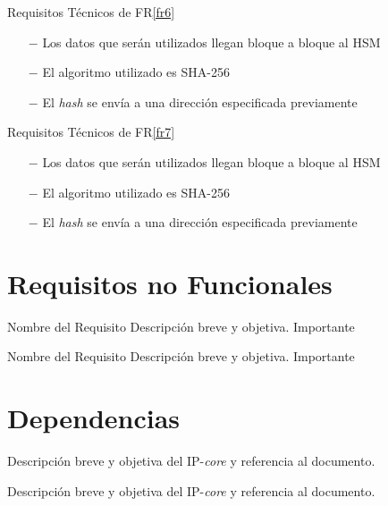 \documentclass{article}
\begin{document}
\begin{technical}
			\techrequirement
			{Requisitos Técnicos de FR\ref{fr6}}
      {
      \begin{itemize}
        \item[$-$]{Los datos que serán utilizados llegan bloque a bloque al HSM}
        \item[$-$]{El algoritmo utilizado es SHA-256}
				\item[$-$]{El \textit{hash} se envía a una dirección especificada previamente}
      \end{itemize}
      }
			
			\techrequirement
			{Requisitos Técnicos de FR\ref{fr7}}
      {
      \begin{itemize}
        \item[$-$]{Los datos que serán utilizados llegan bloque a bloque al HSM}
        \item[$-$]{El algoritmo utilizado es SHA-256}
				\item[$-$]{El \textit{hash} se envía a una dirección especificada previamente}
      \end{itemize}
      }
    \end{technical}    
 
\section{Requisitos no Funcionales}

  \begin{nonfunctional}
		{Nombre del Requisito}
    {Descripción breve y objetiva.}
    {Importante}

		{Nombre del Requisito}
    {Descripción breve y objetiva.}
    {Importante}
  \end{nonfunctional}

\section{Dependencias}

  \begin{dependencies}
		{Descripción breve y objetiva del IP-\textit{core} y referencia al documento.}

		{Descripción breve y objetiva del IP-\textit{core} y referencia al documento.}
  \end{dependencies}  
\end{document}
